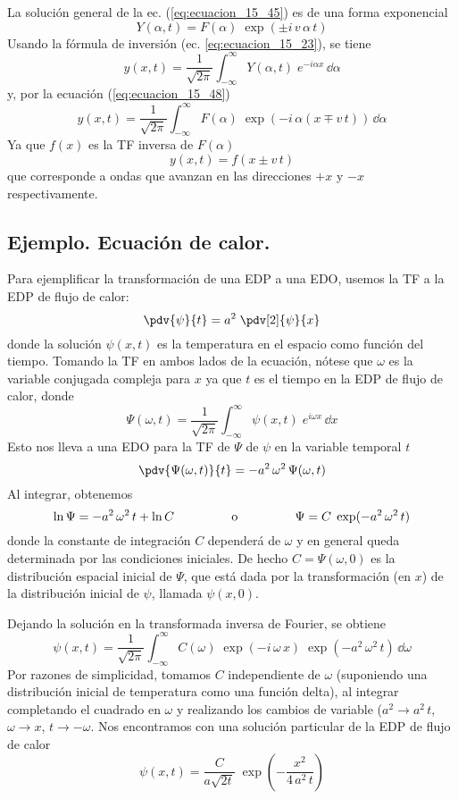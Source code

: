 La solución general de la ec. (\ref{eq:ecuacion_15_45}) es de una forma exponencial
\begin{equation}
Y(\alpha, t) = F(\alpha) \; \exp(\pm  i \, v \, \alpha \, t)
\label{eq:ecuacion_15_48}
\end{equation}
Usando la fórmula de inversión (ec. \ref{eq:ecuacion_15_23}), se tiene
\begin{equation}
y(x,t) = \dfrac{1}{\sqrt{2 \pi}} \int_{-\infty}^{\infty} Y(\alpha, t) \; e^{-i \alpha x} \, \dd \alpha
\label{eq:ecuacion_15_49}
\end{equation}
y, por la ecuación (\ref{eq:ecuacion_15_48})
\begin{equation}
y(x,t) = \dfrac{1}{\sqrt{2 \pi}} \int_{-\infty}^{\infty} F(\alpha) \; \exp(- i \, \alpha (x \mp v \, t)) \, \dd \alpha
\label{eq:ecuacion_15_50}
\end{equation}
Ya que $f(x)$ es la TF inversa de $F(\alpha)$
\begin{equation}
y(x, t) = f (x \pm v \, t)
\label{eq:ecuacion_15_51}
\end{equation}
que corresponde a ondas que avanzan en las direcciones $+x$ y $-x$ respectivamente.
\subsection*{Ejemplo. Ecuación de calor.}
Para ejemplificar la transformación de una EDP a una EDO, usemos la TF a la EDP de flujo de calor:
\[ \pdv{\psi}{t} = a^{2} \; \pdv[2]{\psi}{x} \]
donde la solución $\psi(x,t)$ es la temperatura en el espacio como función del tiempo. Tomando la TF en ambos lados de la ecuación, nótese que $\omega$ es la variable conjugada compleja para $x$ ya que $t$ es el tiempo en la EDP de flujo de calor, donde
\[ \Psi(\omega, t) = \dfrac{1}{\sqrt{2 \pi}} \int_{-\infty}^{\infty} \psi(x, t) \; e^{i \omega x} \, \dd x \]
Esto nos lleva a una EDO para la TF de $\Psi$ de $\psi$ en la variable temporal $t$
\[ \pdv{\Psi(\omega, t)}{t} = -a^{2} \, \omega^{2} \, \Psi(\omega, t) \] 
Al integrar, obtenemos
\[ \ln \Psi = -a^{2} \, \omega^{2} \, t + \ln C \hspace{1.5cm} \text{ o } \hspace{1.5cm} \Psi = C \; \exp(-a^{2} \, \omega^{2} \, t)\]
donde la constante de integración $C$ dependerá de $\omega$ y en general queda determinada por las condiciones iniciales. De hecho $C = \Psi(\omega, 0)$ es la distribución espacial inicial de $\Psi$, que está dada por la transformación (en $x$) de la distribución inicial de $\psi$, llamada $\psi(x,0)$.
\par
Dejando la solución en la transformada inversa de Fourier, se obtiene
\[ \psi(x, t) = \dfrac{1}{\sqrt{2 \pi}} \int_{-\infty}^{\infty} C(\omega) \; \exp(-i \, \omega \, x) \; \exp(-a^{2} \, \omega^{2} \, t) \, \dd \omega \]
Por razones de simplicidad, tomamos $C$ independiente de $\omega$ (suponiendo una distribución inicial de temperatura como una función delta), al integrar completando el cuadrado en $\omega$ y realizando los cambios de variable ($a^{2} \to a^{2} \, t$, $\omega \to x$, $t \to -\omega$. Nos encontramos con una solución particular de la EDP de flujo de calor
\[ \psi(x,t) = \dfrac{C}{a \sqrt{2 t}} \; \exp \left( - \dfrac{x^{2}}{4 \, a^{2} \, t} \right) \]
